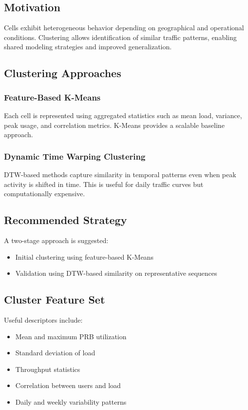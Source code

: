 \documentclass[conference]{IEEEtran}
\begin{document}
\subsection{Motivation}
Cells exhibit heterogeneous behavior depending on geographical and operational conditions. Clustering allows identification of similar traffic patterns, enabling shared modeling strategies and improved generalization.

\subsection{Clustering Approaches}

\subsubsection{Feature-Based K-Means}
Each cell is represented using aggregated statistics such as mean load, variance, peak usage, and correlation metrics. K-Means provides a scalable baseline approach.

\subsubsection{Dynamic Time Warping Clustering}
DTW-based methods capture similarity in temporal patterns even when peak activity is shifted in time. This is useful for daily traffic curves but computationally expensive.

\subsection{Recommended Strategy}
A two-stage approach is suggested:
\begin{itemize}
\item Initial clustering using feature-based K-Means
\item Validation using DTW-based similarity on representative sequences
\end{itemize}

\subsection{Cluster Feature Set}
Useful descriptors include:
\begin{itemize}
\item Mean and maximum PRB utilization
\item Standard deviation of load
\item Throughput statistics
\item Correlation between users and load
\item Daily and weekly variability patterns
\end{itemize}
\end{document}
